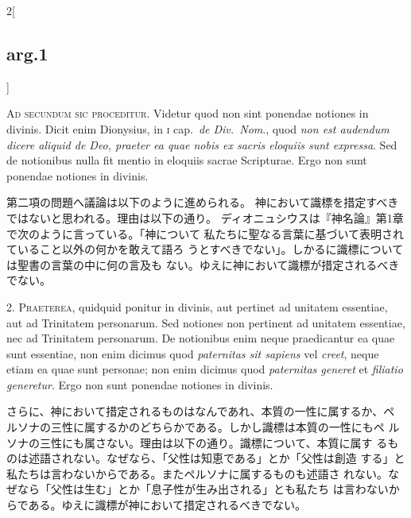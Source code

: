 \documentclass[paper=a4paper,fontsize=10pt,jafontsize=9pt,titlepage]{jlreq}
\begin{document}
{}
\setcounter{section}{2}
\setcounter{subsection}{0}

\begin{paracol}{2}[\subsection{arg.1}]

{\scshape Ad secundum sic proceditur}. Videtur quod non sint ponendae notiones in
divinis. Dicit enim Dionysius, in {\scshape i} cap.~{\itshape de Div.~Nom}., quod {\itshape non est
audendum dicere aliquid de Deo, praeter ea quae nobis ex sacris
eloquiis sunt expressa}. Sed de notionibus nulla fit mentio in eloquiis
sacrae Scripturae. Ergo non sunt ponendae notiones in divinis.

\switchcolumn

第二項の問題へ議論は以下のように進められる。
神において識標を措定すべきではないと思われる。理由は以下の通り。
ディオニュシウスは『神名論』第1章で次のように言っている。「神について
 私たちに聖なる言葉に基づいて表明されていること以外の何かを敢えて語ろ
 うとすべきでない」。しかるに識標については聖書の言葉の中に何の言及も
 ない。ゆえに神において識標が措定されるべきでない。


2. {\scshape Praeterea}, quidquid ponitur in divinis, aut pertinet ad unitatem
essentiae, aut ad Trinitatem personarum. Sed notiones non pertinent ad
unitatem essentiae, nec ad Trinitatem personarum. De notionibus enim
neque praedicantur ea quae sunt essentiae, non enim dicimus quod
{\itshape paternitas sit sapiens} vel {\itshape creet}, neque etiam ea quae sunt personae;
non enim dicimus quod {\itshape paternitas generet} et {\itshape filiatio generetur}. Ergo
non sunt ponendae notiones in divinis.

\switchcolumn

さらに、神において措定されるものはなんであれ、本質の一性に属するか、ペ
 ルソナの三性に属するかのどちらかである。しかし識標は本質の一性にもペ
 ルソナの三性にも属さない。理由は以下の通り。識標について、本質に属す
 るものは述語されない。なぜなら、「父性は知恵である」とか「父性は創造
 する」と私たちは言わないからである。またペルソナに属するものも述語さ
 れない。なぜなら「父性は生む」とか「息子性が生み出される」とも私たち
 は言わないからである。ゆえに識標が神において措定されるべきでない。


\end{paracol}
\end{document}
